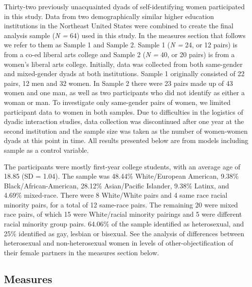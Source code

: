 \documentclass[man]{apa6}
\begin{document}
Thirty-two previously unacquainted dyads of self-identifying women
participated in this study. Data from two demographically similar higher
education institutions in the Northeast United States were combined to
create the final analysis sample (\emph{N =} 64) used in this study. In
the measures section that follows we refer to them as Sample 1 and
Sample 2. Sample 1 (\emph{N =} 24, or 12 pairs) is from a co-ed liberal
arts college and Sample 2 (\emph{N =} 40, or 20 pairs) is from a women's
liberal arts college. Initially, data was collected from both
same-gender and mixed-gender dyads at both institutions. Sample 1
originally consisted of 22 pairs, 12 men and 32 women. In Sample 2 there
were 23 pairs made up of 43 women and one man, as well as two
participants who did not identify as either a woman or man. To
investigate only same-gender pairs of women, we limited participant data
to women in both samples. Due to difficulties in the logistics of dyadic
interaction studies, data collection was discontinued after one year at
the second institution and the sample size was taken as the number of
women-women dyads at this point in time. All results presented below are
from models including sample as a control variable.

The participants were mostly first-year college students, with an
average age of 18.85 (SD = 1.04). The sample was 48.44\% White/European
American, 9.38\% Black/African-American, 28.12\% Asian/Pacific Islander,
9.38\% Latinx, and 4.69\% mixed-race. There were 8 White/White pairs and
4 same race racial minority pairs, for a total of 12 same-race pairs.
The remaining 20 were mixed race pairs, of which 15 were White/racial
minority pairings and 5 were different racial minority group pairs.
64.06\% of the sample identified as heterosexual, and 25\% identified as
gay, lesbian or bisexual. See the analysis of differences between
heterosexual and non-heterosexual women in levels of
other-objectification of their female partners in the measures section
below.

\subsection{Measures}\label{measures}
\end{document}
